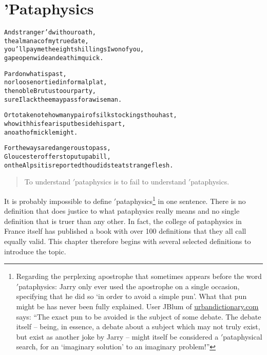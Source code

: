 
\chapter[Pataphysics]{'Pataphysics}
\label{ch:pataphysics}

\startcontents[chapters]

\vfill

\begin{alltt}\sffamily
And stranger'd with our oath,
the almanac of my true date,
you'll pay me the eight shillings I won of you,
gape open wide and eat him quick.

Pardon what is past,
nor loose nor tied in formal plat, 
the noble Brutus to our party,
sure I lack thee may pass for a wise man.

Or to take note how many pair of silk stockings thou hast,
who with his fear is put beside his part,
an oath of mickle might.

For the ways are dangerous to pass,  
Gloucester offers to put up a bill,
on the Alps it is reported thou didst eat strange flesh.
\end{alltt}

\newpage
\minicontents
\spirals


\label{s:definitions}

\begin{quotation}
  To understand $'$pataphysics is to fail to understand $'$pataphysics. 
\end{quotation}

It is probably impossible to define $'$pataphysics\footnote{Regarding the perplexing apostrophe that sometimes appears before the word $'$pataphysics: Jarry only ever used the apostrophe on a single occasion, specifying that he did so `in order to avoid a simple pun'. What that pun might be has never been fully explained. User JBlum of \url{urbandictionary.com} says: ``The exact pun to be avoided is the subject of some debate. The debate itself -- being, in essence, a debate about a subject which may not truly exist, but exist as another joke by Jarry -- might itself be considered a $'$pataphysical search, for an `imaginary solution' to an imaginary problem!''} in one sentence. There is no definition that does justice to what pataphysics really means and no single definition that is truer than any other. In fact, the college of pataphysics in France itself has published a book \autocite{Brotchie2003} with over \num{100} definitions that they all call equally valid. This chapter therefore begins with several selected definitions to introduce the topic.

